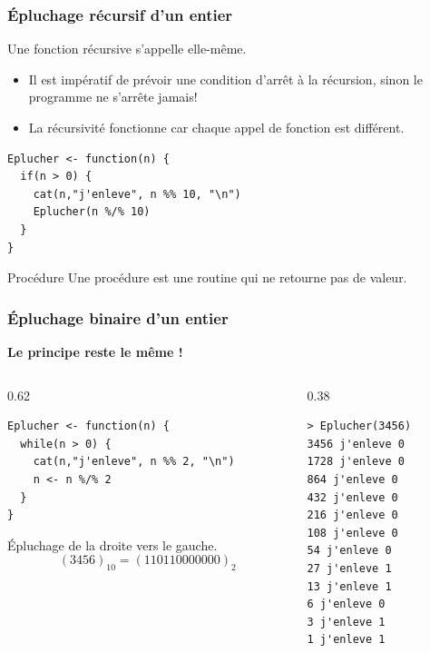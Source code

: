 \documentclass[10pt]{beamer}
\begin{document}
\begin{frame}[fragile]
  \frametitle{Épluchage récursif d'un entier}
  \begin{block}{Une fonction récursive s'appelle elle-même.}
    \begin{itemize}
    \item Il est impératif de prévoir une condition d'arrêt à la récursion, sinon le programme ne s'arrête jamais!
    \item La récursivité fonctionne car chaque appel de fonction est différent.
    \end{itemize}

  \end{block}

  \begin{lstlisting}[style=editor]
Eplucher <- function(n) {
  if(n > 0) {
    cat(n,"j'enleve", n %% 10, "\n")
    Eplucher(n %/% 10)
  }
}
  \end{lstlisting}

  \begin{block}{Procédure}
    Une procédure est une routine qui ne retourne pas de valeur.
  \end{block}

\end{frame}



\begin{frame}[fragile]
  \frametitle{Épluchage  binaire d'un entier}
  \begin{center}
    \alert{\textbf{Le principe reste le même !}}
  \end{center}


\begin{columns}[t]
\begin{column}{0.62\textwidth}
\begin{lstlisting}[style=editor]
Eplucher <- function(n) {
  while(n > 0) {
    cat(n,"j'enleve", n %% 2, "\n")
    n <- n %/% 2
  }
}
\end{lstlisting}
Épluchage de la droite vers le gauche.
$$
(3456)_{10} = (110110000000)_2
$$

\end{column}
\begin{column}{0.38\textwidth}
  \begin{lstlisting}
> Eplucher(3456)
3456 j'enleve 0
1728 j'enleve 0
864 j'enleve 0
432 j'enleve 0
216 j'enleve 0
108 j'enleve 0
54 j'enleve 0
27 j'enleve 1
13 j'enleve 1
6 j'enleve 0
3 j'enleve 1
1 j'enleve 1
\end{lstlisting}
\end{column}
\end{columns}
\end{frame}
\end{document}
